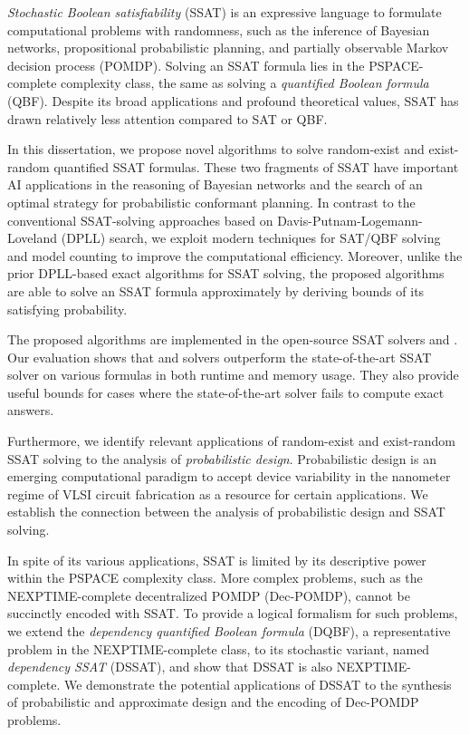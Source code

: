 \textit{Stochastic Boolean satisfiability} (SSAT) is an expressive language to formulate computational problems with randomness,
such as the inference of Bayesian networks, propositional probabilistic planning, and partially observable Markov decision process (POMDP).
Solving an SSAT formula lies in the PSPACE-complete complexity class, the same as solving a \textit{quantified Boolean formula} (QBF).
Despite its broad applications and profound theoretical values,
SSAT has drawn relatively less attention compared to SAT or QBF.

In this dissertation, we propose novel algorithms to solve random-exist and exist-random quantified SSAT formulas.
These two fragments of SSAT have important AI applications in the reasoning of Bayesian networks and the search of an optimal strategy for probabilistic conformant planning.
In contrast to the conventional SSAT-solving approaches based on Davis-Putnam-Logemann-Loveland (DPLL) search,
we exploit modern techniques for SAT/QBF solving and model counting to improve the computational efficiency.
Moreover, unlike the prior DPLL-based exact algorithms for SSAT solving,
the proposed algorithms are able to solve an SSAT formula approximately by deriving bounds of its satisfying probability.

The proposed algorithms are implemented in the open-source SSAT solvers \ressat and \erssat.
Our evaluation shows that \ressat and \erssat solvers outperform the state-of-the-art SSAT solver on various formulas in both runtime and memory usage.
They also provide useful bounds for cases where the state-of-the-art solver fails to compute exact answers.

Furthermore, we identify relevant applications of random-exist and exist-random SSAT solving to the analysis of \textit{probabilistic design}.
Probabilistic design is an emerging computational paradigm to accept device variability in the nanometer regime of VLSI circuit fabrication as a resource for certain applications.
We establish the connection between the analysis of probabilistic design and SSAT solving.

In spite of its various applications,
SSAT is limited by its descriptive power within the PSPACE complexity class.
More complex problems, such as the NEXPTIME-complete decentralized POMDP (Dec-POMDP), cannot be succinctly encoded with SSAT.
To provide a logical formalism for such problems,
we extend the \textit{dependency quantified Boolean formula} (DQBF),
a representative problem in the NEXPTIME-complete class,
to its stochastic variant, named \textit{dependency SSAT} (DSSAT),
and show that DSSAT is also NEXPTIME-complete.
We demonstrate the potential applications of DSSAT to the synthesis of probabilistic and approximate design and the encoding of Dec-POMDP problems.

